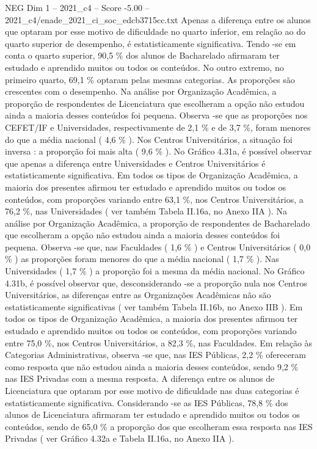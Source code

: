 \begin{textsample}{NEG Dim 1 – 2021\_c4 – Score -5.00 – 2021\_c4/enade\_2021\_ci\_soc\_edcb3715cc.txt}
Apenas a diferença entre os alunos que optaram por esse motivo de dificuldade no quarto inferior, em relação ao do quarto superior de desempenho, é estatisticamente significativa.
Tendo -se em conta o quarto superior, 90,5 \% dos alunos de Bacharelado afirmaram ter estudado e aprendido muitos ou todos os conteúdos.
No outro extremo, no primeiro quarto, 69,1 \% optaram pelas mesmas categorias.
As proporções são crescentes com o desempenho.
Na análise por Organização Acadêmica, a proporção de respondentes de Licenciatura que escolheram a opção não estudou ainda a maioria desses conteúdos foi pequena.
Observa -se que as proporções nos CEFET/IF e Universidades, respectivamente de 2,1 \% e de 3,7 \%, foram menores do que a média nacional ( 4,6 \% ).
Nos Centros Universitários, a situação foi inversa : a proporção foi mais alta ( 9,6 \% ).
No Gráfico 4.31a, é possível observar que apenas a diferença entre Universidades e Centros Universitários é estatisticamente significativa.
Em todos os tipos de Organização Acadêmica, a maioria dos presentes afirmou ter estudado e aprendido muitos ou todos os conteúdos, com proporções variando entre 63,1 \%, nos Centros Universitários, a 76,2 \%, nas Universidades ( ver também Tabela II.16a, no Anexo IIA ).
Na análise por Organização Acadêmica, a proporção de respondentes de Bacharelado que escolheram a opção não estudou ainda a maioria desses conteúdos foi pequena.
Observa -se que, nas Faculdades ( 1,6 \% ) e Centros Universitários ( 0,0 \% ) as proporções foram menores do que a média nacional ( 1,7 \% ).
Nas Universidades ( 1,7 \% ) a proporção foi a mesma da média nacional.
No Gráfico 4.31b, é possível observar que, desconsiderando -se a proporção nula nos Centros Universitários, as diferenças entre as Organizações Acadêmicas não são estatisticamente significativas ( ver também Tabela II.16b, no Anexo IIB ).
Em todos os tipos de Organização Acadêmica, a maioria dos presentes afirmou ter estudado e aprendido muitos ou todos os conteúdos, com proporções variando entre 75,0 \%, nos Centros Universitários, a 82,3 \%, nas Faculdades.
Em relação às Categorias Administrativas, observa -se que, nas IES Públicas, 2,2 \% ofereceram como resposta que não estudou ainda a maioria desses conteúdos, sendo 9,2 \% nas IES Privadas com a mesma resposta.
A diferença entre os alunos de Licenciatura que optaram por esse motivo de dificuldade nas duas categorias é estatisticamente significativa.
Considerando -se as IES Públicas, 78,8 \% dos alunos de Licenciatura afirmaram ter estudado e aprendido muitos ou todos os conteúdos, sendo de 65,0 \% a proporção dos que escolheram essa resposta nas IES Privadas ( ver Gráfico 4.32a e Tabela II.16a, no Anexo IIA ).

\end{textsample}
